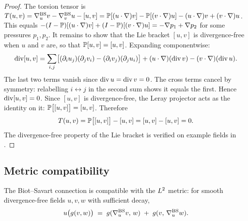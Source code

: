 \begin{proof}
  The torsion tensor is
  $T(u,v) = \nabla^{\mathrm{BS}}_u v - \nabla^{\mathrm{BS}}_v u - [u,v]
   = \mathbb{P}[(u \cdot \nabla)v] - \mathbb{P}[(v \cdot \nabla)u]
     - (u \cdot \nabla)v + (v \cdot \nabla)u$.
  This equals
  $-(I - \mathbb{P})[(u \cdot \nabla)v] + (I - \mathbb{P})[(v \cdot \nabla)u]
   = -\nabla p_1 + \nabla p_2$
  for some pressures $p_1, p_2$.  It remains to show that the Lie bracket $[u,v]$ is
  divergence-free when $u$ and $v$ are, so that $\mathbb{P}[u,v] = [u,v]$.
  Expanding componentwise:
  \[
    \operatorname{div}[u,v]
    = \sum_{i,j}\bigl[(\partial_i u_j)(\partial_j v_i)
      - (\partial_i v_j)(\partial_j u_i)\bigr]
    + (u \cdot \nabla)(\operatorname{div} v)
    - (v \cdot \nabla)(\operatorname{div} u).
  \]
  The last two terms vanish since $\operatorname{div} u = \operatorname{div} v = 0$.
  The cross terms cancel by symmetry: relabelling $i \leftrightarrow j$ in
  the second sum shows it equals the first.  Hence $\operatorname{div}[u,v] = 0$.
  Since $[u,v]$ is divergence-free, the Leray projector acts as the identity on it:
  $\mathbb{P}\bigl[[u,v]\bigr] = [u,v]$.  Therefore
  \[
    T(u,v)
    = \mathbb{P}\bigl[[u,v]\bigr] - [u,v]
    = [u,v] - [u,v] = 0.
  \]
  The divergence-free property of the Lie bracket is verified on example fields in
  .
\end{proof}

\subsection{Metric compatibility}

\begin{proposition}\label{prop:metric-compat}
  The Biot--Savart connection is compatible with the $L^{2}$ metric: for smooth
  divergence-free fields $u, v, w$ with sufficient decay,
  \begin{equation}\label{eq:metric-compat}
    u\bigl(g(v, w)\bigr)
    \;=\; g(\nabla^{\mathrm{BS}}_u v,\, w) \;+\; g(v,\, \nabla^{\mathrm{BS}}_u w).
  \end{equation}
\end{proposition}

